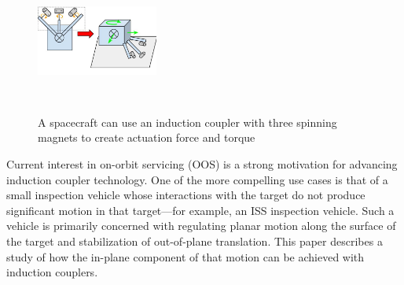 \begin{figure}
\includegraphics[width = 4cm, height = 4cm ]{figures/Induction_Coupler_Overview_Diagram.jpg}
\label{fig:inspector_diagram}
\caption{A spacecraft can use an induction coupler with three spinning magnets to create actuation force and torque}
\end{figure}
 
Current interest in on-orbit servicing (OOS) is a strong motivation for advancing induction coupler technology. \cite{Ambrose2012}
 One of the more compelling use cases is that of a small inspection vehicle whose interactions with the target do not produce significant motion in that target—for example, an ISS inspection vehicle. Such a vehicle is primarily concerned with regulating planar motion along the surface of the target and stabilization of out-of-plane translation. This paper describes a study of how the in-plane component of that motion can be achieved with induction couplers.


